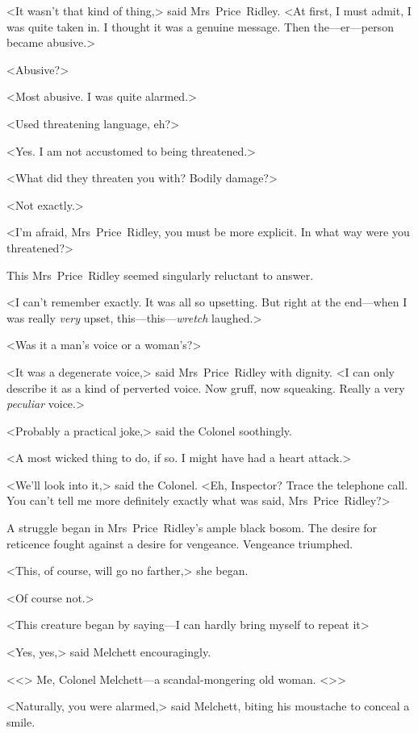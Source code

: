 <It wasn't that kind of thing,> said Mrs~Price~Ridley. <At first, I must admit, I was quite taken in. I thought it was a genuine message. Then the—er—person became abusive.>

<Abusive?>

<Most abusive. I was quite alarmed.>

<Used threatening language, eh?>

<Yes. I am not accustomed to being threatened.>

<What did they threaten you with? Bodily damage?>

<Not exactly.>

<I'm afraid, Mrs~Price~Ridley, you must be more explicit. In what way were you threatened?>

This Mrs~Price~Ridley seemed singularly reluctant to answer.

<I can't remember exactly. It was all so upsetting. But right at the end—when I was really \emph{very} upset, this—this—\emph{wretch} laughed.>

<Was it a man's voice or a woman's?>

<It was a degenerate voice,> said Mrs~Price~Ridley with dignity. <I can only describe it as a kind of perverted voice. Now gruff, now squeaking. Really a very \emph{peculiar} voice.>

<Probably a practical joke,> said the Colonel soothingly.

<A most wicked thing to do, if so. I might have had a heart attack.>

<We'll look into it,> said the Colonel. <Eh, Inspector? Trace the telephone call. You can't tell me more definitely exactly what was said, Mrs~Price~Ridley?>

A struggle began in Mrs~Price~Ridley's ample black bosom. The desire for reticence fought against a desire for vengeance. Vengeance triumphed.

<This, of course, will go no farther,> she began.

<Of course not.>

<This creature began by saying—I can hardly bring myself to repeat it\longdash>

<Yes, yes,> said Melchett encouragingly.

<<> Me, Colonel Melchett—a scandal-mongering old woman. <>>

<Naturally, you were alarmed,> said Melchett, biting his moustache to conceal a smile.

